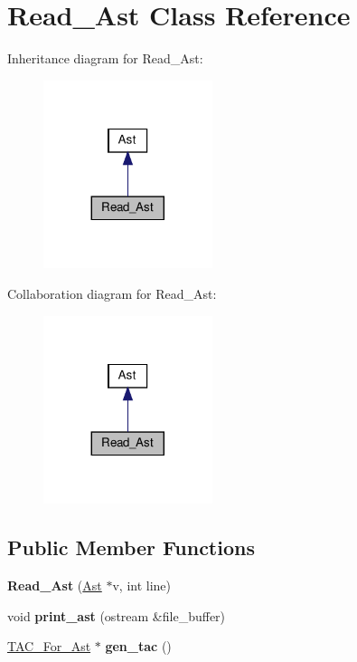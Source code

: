 \hypertarget{classRead__Ast}{}\section{Read\+\_\+\+Ast Class Reference}
\label{classRead__Ast}


Inheritance diagram for Read\+\_\+\+Ast\+:
\nopagebreak
\begin{figure}[H]
\begin{center}
\leavevmode
\includegraphics[width=140pt]{classRead__Ast__inherit__graph}
\end{center}
\end{figure}


Collaboration diagram for Read\+\_\+\+Ast\+:
\nopagebreak
\begin{figure}[H]
\begin{center}
\leavevmode
\includegraphics[width=140pt]{classRead__Ast__coll__graph}
\end{center}
\end{figure}
\subsection*{Public Member Functions}
\begin{DoxyCompactItemize}
\item 
\mbox{\label{classRead__Ast_a41cfed04bdc621bdff39bfd134f0c00e}} 
{\bfseries Read\+\_\+\+Ast} (\hyperlink{classAst}{Ast} $\ast$v, int line)
\item 
\mbox{\label{classRead__Ast_a17149245f87884aba7bae0c518779e27}} 
void {\bfseries print\+\_\+ast} (ostream \&file\+\_\+buffer)
\item 
\mbox{\label{classRead__Ast_a1471603ed7482c7ad518637e200e5ff4}} 
\hyperlink{classTAC__For__Ast}{T\+A\+C\+\_\+\+For\+\_\+\+Ast} $\ast$ {\bfseries gen\+\_\+tac} ()
\end{DoxyCompactItemize}
